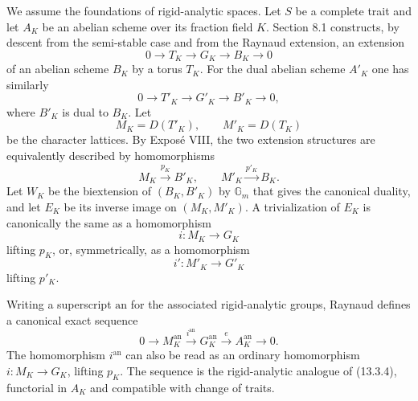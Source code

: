 \documentclass[12pt]{article}
\providecommand{\Gm}{\mathbb G_m}
\providecommand{\an}{\mathrm{an}}
\begin{document}
We assume the foundations of rigid-analytic spaces.  Let $S$ be a complete trait and let $A_K$ be an abelian scheme over its fraction field $K$.  Section 8.1 constructs, by descent from the semi-stable case and from the Raynaud extension, an extension
\begin{equation}\tag{14.1.1}
        0\longrightarrow T_K\longrightarrow G_K\longrightarrow B_K\longrightarrow0
\end{equation}
of an abelian scheme $B_K$ by a torus $T_K$.  For the dual abelian scheme $A'_K$ one has similarly
\begin{equation}\tag{14.1.2}
        0\longrightarrow T'_K\longrightarrow G'_K\longrightarrow B'_K\longrightarrow0,
\end{equation}
where $B'_K$ is dual to $B_K$.  Let
\begin{equation}\tag{14.1.3}
        M_K=D(T'_K),\qquad M'_K=D(T_K)
\end{equation}
be the character lattices.  By Expos\'e VIII, the two extension structures are equivalently described by homomorphisms
\begin{equation}\tag{14.1.4}
        M_K\xrightarrow{p_K}B'_K,
        \qquad
        M'_K\xrightarrow{p'_K}B_K.
\end{equation}
Let $W_K$ be the biextension of $(B_K,B'_K)$ by $\Gm$ that gives the canonical duality, and let $E_K$ be its inverse image on $(M_K,M'_K)$.  A trivialization of $E_K$ is canonically the same as a homomorphism
\begin{equation}\tag{14.1.5}
        i:M_K\longrightarrow G_K
\end{equation}
lifting $p_K$, or, symmetrically, as a homomorphism
\begin{equation}\tag{14.1.6}
        i':M'_K\longrightarrow G'_K
\end{equation}
lifting $p'_K$.

Writing a superscript $\an$ for the associated rigid-analytic groups, Raynaud defines a canonical exact sequence
\begin{equation}\tag{14.1.7}
        0\longrightarrow M_K^{\an}
        \xrightarrow{i^{\an}}G_K^{\an}
        \xrightarrow{e}A_K^{\an}\longrightarrow0.
\end{equation}
The homomorphism $i^{\an}$ can also be read as an ordinary homomorphism $i:M_K\to G_K$, lifting $p_K$.  The sequence is the rigid-analytic analogue of (13.3.4), functorial in $A_K$ and compatible with change of traits.
\end{document}
